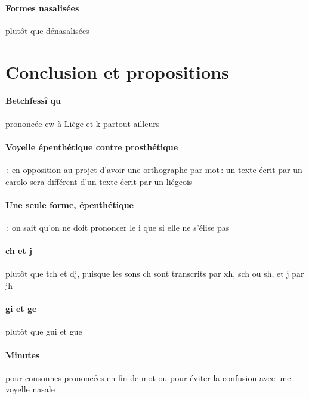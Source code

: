 \documentclass[french]{article}
\begin{document}
\paragraph{Formes nasalisées} plutôt que dénasalisées

\section{Conclusion et propositions}

\paragraph{Betchfessî qu} prononcée cw à Liège et k partout ailleurs
\paragraph{Voyelle épenthétique contre prosthétique}\,: en opposition au projet d'avoir une orthographe par mot\,: un texte écrit par un carolo sera différent d'un texte écrit par un liégeois
\paragraph{Une seule forme, épenthétique}\,: on sait qu'on ne doit prononcer le i que si elle ne s'élise pas
\paragraph{ch et j} plutôt que tch et dj, puisque les sons ch sont transcrits par xh, sch ou sh, et j par jh
\paragraph{gi et ge} plutôt que gui et gue
\paragraph{Minutes} pour consonnes prononcées en fin de mot ou pour éviter la confusion avec une voyelle nasale
\end{document}
